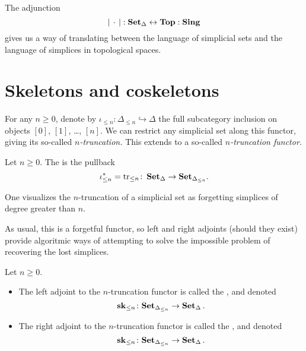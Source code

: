 \documentclass[main.tex]{subfiles}
\begin{document}
The adjunction
\begin{equation*}
  {| \,\cdot\, |} : \operatorname{\mathbf{Set}_{\Delta}} \leftrightarrow \mathbf{Top} : \mathbf{Sing}
\end{equation*}
gives us a way of translating between the language of simplicial sets and the language of simplices in topological spaces.

\section{Skeletons and coskeletons}
\label{sec:skeletons_and_coskeletons}

For any $n \geq 0$, denote by $\iota_{\leq n}\colon \Delta_{\leq n} \hookrightarrow \Delta$ the full subcategory inclusion on objects $[0]$, $[1]$, \ldots, $[n]$. We can restrict any simplicial set along this functor, giving its so-called \emph{$n$-truncation.} This extends to a so-called \emph{$n$-truncation functor.}

\begin{definition}[truncation]
  \label{def:truncation}
  Let $n \geq 0$. The  is the pullback
  \begin{equation*}
    \iota_{\leq n}^{*} = \mathrm{tr}_{\leq n}\colon \operatorname{\mathbf{Set}_{\Delta}} \to \mathbf{Set}_{\Delta_{\leq n}}.
  \end{equation*}
\end{definition}

One visualizes the $n$-truncation of a simplicial set as forgetting simplices of degree greater than $n$.

As usual, this is a forgetful functor, so left and right adjoints (should they exist) provide algoritmic ways of attempting to solve the impossible problem of recovering the lost simplices.

\begin{definition}
  \label{def:skeleton_coskeleton}
  Let $n \geq 0$.
  \begin{itemize}
    \item The left adjoint to the $n$-truncation functor is called the , and denoted
      \begin{equation*}
        \mathbf{sk}_{\leq n}\colon \mathbf{Set}_{\Delta_{\leq n}} \to \operatorname{\mathbf{Set}_{\Delta}}.
      \end{equation*}

    \item The right adjoint to the $n$-truncation functor is called the , and denoted
      \begin{equation*}
        \mathbf{sk}_{\leq n}\colon \mathbf{Set}_{\Delta_{\leq n}} \to \operatorname{\mathbf{Set}_{\Delta}}.
      \end{equation*}
  \end{itemize}
\end{definition}
\end{document}
